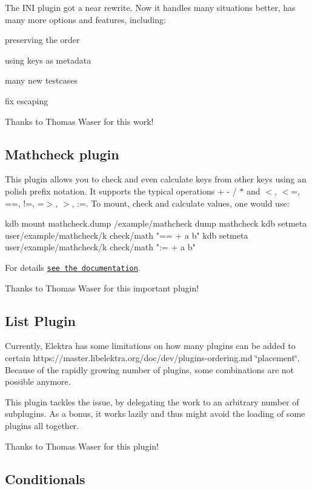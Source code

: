 The I\+NI plugin got a near rewrite. Now it handles many situations better, has many more options and features, including\+:


\begin{DoxyItemize}
\item preserving the order
\item using keys as metadata
\item many new testcases
\item fix escaping
\end{DoxyItemize}

Thanks to Thomas Waser for this work!

\subsection*{Mathcheck plugin}

This plugin allows you to check and even calculate keys from other keys using an polish prefix notation. It supports the typical operations {\ttfamily + -\/ / $\ast$} and {\ttfamily $<$, $<$=, ==, !=, =$>$, $>$, \+:=}. To mount, check and calculate values, one would use\+: \begin{DoxyVerb}kdb mount mathcheck.dump /example/mathcheck dump mathcheck
kdb setmeta user/example/mathcheck/k check/math "== + a b"
kdb setmeta user/example/mathcheck/k check/math ":= + a b"
\end{DoxyVerb}


For details \href{https://master.libelektra.org/src/plugins/mathcheck/}{\tt see the documentation}.

Thanks to Thomas Waser for this important plugin!

\subsection*{List Plugin}

Currently, Elektra has some limitations on how many plugins can be added to certain https\+://master.libelektra.\+org/doc/dev/plugins-\/ordering.md \char`\"{}placement\char`\"{}. Because of the rapidly growing number of plugins, some combinations are not possible anymore.

This plugin tackles the issue, by delegating the work to an arbitrary number of subplugins. As a bonus, it works lazily and thus might avoid the loading of some plugins all together.

Thanks to Thomas Waser for this plugin!

\subsection*{Conditionals}

